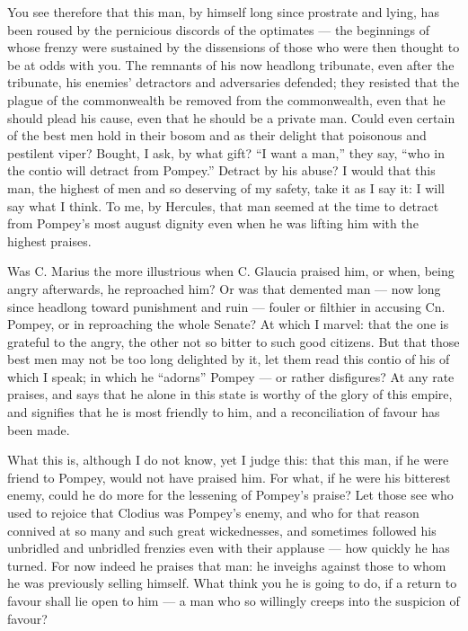  You see therefore that this man, by himself long since prostrate and lying, has been roused by the pernicious discords of the optimates --- the beginnings of whose frenzy were sustained by the dissensions of those who were then thought to be at odds with you. The remnants of his now headlong tribunate, even after the tribunate, his enemies' detractors and adversaries defended; they resisted that the plague of the commonwealth be removed from the commonwealth, even that he should plead his cause, even that he should be a private man. Could even certain of the best men hold in their bosom and as their delight that poisonous and pestilent viper? Bought, I ask, by what gift? ``I want a man,'' they say, ``who in the contio will detract from Pompey.'' Detract by his abuse? I would that this man, the highest of men and so deserving of my safety, take it as I say it: I will say what I think. To me, by Hercules, that man seemed at the time to detract from Pompey's most august dignity even when he was lifting him with the highest praises.

 Was C. Marius the more illustrious when C. Glaucia praised him, or when, being angry afterwards, he reproached him? Or was that demented man --- now long since headlong toward punishment and ruin --- fouler or filthier in accusing Cn. Pompey, or in reproaching the whole Senate? At which I marvel: that the one is grateful to the angry, the other not so bitter to such good citizens. But that those best men may not be too long delighted by it, let them read this contio of his of which I speak; in which he ``adorns'' Pompey --- or rather disfigures? At any rate praises, and says that he alone in this state is worthy of the glory of this empire, and signifies that he is most friendly to him, and a reconciliation of favour has been made.

 What this is, although I do not know, yet I judge this: that this man, if he were friend to Pompey, would not have praised him. For what, if he were his bitterest enemy, could he do more for the lessening of Pompey's praise? Let those see who used to rejoice that Clodius was Pompey's enemy, and who for that reason connived at so many and such great wickednesses, and sometimes followed his unbridled and unbridled frenzies even with their applause --- how quickly he has turned. For now indeed he praises that man: he inveighs against those to whom he was previously selling himself. What think you he is going to do, if a return to favour shall lie open to him --- a man who so willingly creeps into the suspicion of favour?

